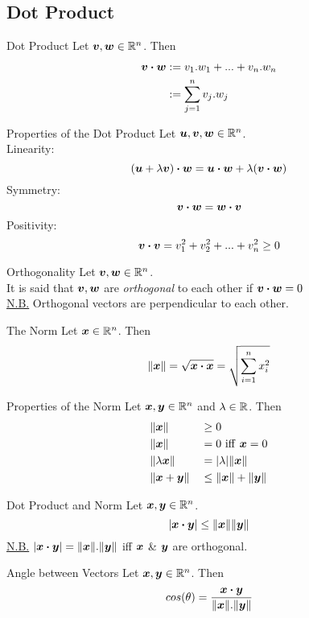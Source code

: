 \documentclass[11pt,a4paper]{article}
\begin{document}
\subsection{Dot Product}
%
\subtitle{Definition 2.04 - }{Dot Product}
Let $\boldsymbol{v}, \boldsymbol{w} \in \mathbb{R}^n$. Then \begin{alignat*}{1}
\boldsymbol{v} \boldsymbol{\cdot} \boldsymbol{w} &:= v_1.w_1 + ... + v_n.w_n \\
&:= \sum_{j=1}^n v_j.w_j
\end{alignat*}

\subtitle{Theorem 2.05 - }{Properties of the Dot Product}
Let $\boldsymbol{u}, \boldsymbol{v}, \boldsymbol{w} \in \mathbb{R}^n$.\\
Linearity:
$$(\boldsymbol{u} + \lambda\boldsymbol{v}) \boldsymbol{\cdot} \boldsymbol{w} = \boldsymbol{u} \boldsymbol{\cdot} \boldsymbol{w} + \lambda(\boldsymbol{v} \boldsymbol{\cdot} \boldsymbol{w})$$
Symmetry:
$$\boldsymbol{v} \boldsymbol{\cdot} \boldsymbol{w} = \boldsymbol{w} \boldsymbol{\cdot} \boldsymbol{v}$$
Positivity:
$$\boldsymbol{v} \boldsymbol{\cdot} \boldsymbol{v} = v_1^2 + v_2^2 + ... +v_n^2 \geq 0$$

\subtitle{Definition 2.06 - }{Orthogonality}
Let $\boldsymbol{v}, \boldsymbol{w} \in \mathbb{R}^n$. \\
It is said that $\boldsymbol{v}, \boldsymbol{w}$ are \textit{orthogonal} to each other if $\boldsymbol{v} \boldsymbol{\cdot} \boldsymbol{w} = 0$ \\
\underline{N.B.} Orthogonal vectors are perpendicular to each other. \\

\subtitle{Definition 2.07 - }{The Norm}
Let $\boldsymbol{x} \in \mathbb{R}^n$. Then
$$\|\boldsymbol{x}\| = \sqrt{\boldsymbol{x} \boldsymbol{\cdot} \boldsymbol{x}} = \sqrt{\sum_{i=1}^n x_i^2}$$

\subtitle{Theorem 2.08 - }{Properties of the Norm}
Let $\boldsymbol{x}, \boldsymbol{y} \in \mathbb{R}^n$ and $\lambda \in \mathbb{R}$. Then
\begin{alignat*}{2}
  &\|\boldsymbol{x}\| &&\geq 0 \\
  &\|\boldsymbol{x}\| &&= 0 \mathrm{\ iff\ } \boldsymbol{x} = 0 \\
  &\|\lambda\boldsymbol{x}\| &&= |\lambda| \|\boldsymbol{x}\| \\
  &\|\boldsymbol{x} + \boldsymbol{y}\| &&\leq \|\boldsymbol{x}\| + \|\boldsymbol{y}\|
\end{alignat*}

\subtitle{Theorem 2.09 - }{Dot Product and Norm}
Let $\boldsymbol{x}, \boldsymbol{y} \in \mathbb{R}^n$.
$$|\boldsymbol{x} \boldsymbol{\cdot} \boldsymbol{y}| \leq \|\boldsymbol{x}\| \|\boldsymbol{y}\|$$
\underline{N.B.} $|\boldsymbol{x} \boldsymbol{\cdot} \boldsymbol{y}| = \|\boldsymbol{x}\|.\|\boldsymbol{y}\|$ iff $\boldsymbol{x}$ \& $\boldsymbol{y}$ are orthogonal.\\

\subtitle{Theorem 2.10 - }{Angle between Vectors}
Let $\boldsymbol{x}, \boldsymbol{y} \in \mathbb{R}^n$. Then
$$cos(\theta) = \frac{\boldsymbol{x} \boldsymbol{\cdot} \boldsymbol{y}}{\|\boldsymbol{x}\|.\|\boldsymbol{y}\|}$$
\end{document}
